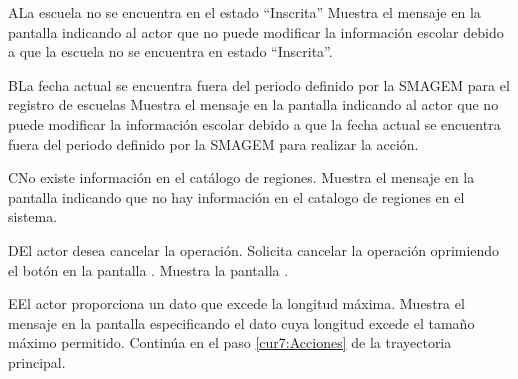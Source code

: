
 \begin{UCtrayectoriaA}{A}{La escuela no se encuentra en el estado ``Inscrita''}
    \UCpaso[\UCsist] Muestra el mensaje  en la pantalla  indicando al actor que no puede modificar la información escolar debido a que la escuela no se encuentra en estado ``Inscrita''.
 \end{UCtrayectoriaA}

 \begin{UCtrayectoriaA}{B}{La fecha actual se encuentra fuera del periodo definido por la SMAGEM para el registro de escuelas}
    \UCpaso[\UCsist] Muestra el mensaje  en la pantalla  indicando al actor que no puede modificar la información escolar debido a que la fecha actual se encuentra fuera del periodo definido por la SMAGEM para realizar la acción.
 \end{UCtrayectoriaA}

 \begin{UCtrayectoriaA}{C}{No existe información en el catálogo de regiones.}
    \UCpaso[\UCsist] Muestra el mensaje  en la pantalla  indicando que no hay información en el catalogo de regiones en el sistema.
  \end{UCtrayectoriaA}

 \begin{UCtrayectoriaA}{D}{El actor desea cancelar la operación.}
    \UCpaso[\UCactor] Solicita cancelar la operación oprimiendo el botón  en la pantalla .
    \UCpaso[\UCsist] Muestra la pantalla .
 \end{UCtrayectoriaA}

 \begin{UCtrayectoriaA}{E}{El actor proporciona un dato que excede la longitud máxima.}
    \UCpaso[\UCsist] Muestra el mensaje  en la pantalla  especificando el dato cuya longitud excede el tamaño máximo permitido.
   \UCpaso[] Continúa en el paso \ref{cur7:Acciones} de la trayectoria principal.
 \end{UCtrayectoriaA}

